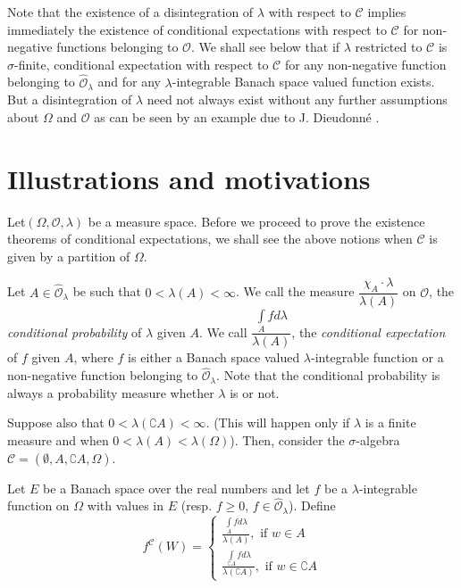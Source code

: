 Note that the existence of a disintegration of $\lambda$ with respect
to $\mathscr{C}$ implies immediately the existence of conditional
expectations with respect to $\mathscr{C}$ for non-negative functions
belonging to $\mathscr{O}$. We shall see below that if $\lambda$
restricted to $\mathscr{C}$ is $\sigma$-finite, conditional
expectation with respect to $\mathscr{C}$ for any non-negative
function belonging to $\hat{\mathscr{O}}_\lambda$ and for any
$\lambda$-integrable Banach space valued function exists. But a
disintegration of $\lambda$ need not always exist without any further
assumptions about $\Omega$ and $\mathscr{O}$ as can be seen by an
example due to J. Dieudonn\'e \cite{key1}. 

\section{Illustrations and motivations}\label{part1:chap1:sec4}

Let\pageoriginale $(\Omega, \mathscr{O}, \lambda)$ be a measure
space. Before we proceed to prove the existence theorems of
conditional expectations, we shall see the above notions when
$\mathscr{C}$ is given by a partition of $\Omega$. 

Let $A \in \hat{\mathscr{O}}_\lambda$ be such that $0 < \lambda (A) <
\infty$. We call the measure $\dfrac{\chi_A \cdot
  \lambda}{\lambda(A)}$ on $\mathscr{O}$, the \textit{conditional
  probability} of $\lambda$ given $A$. We call $\dfrac{\int\limits_A f
d \lambda}{\lambda(A)}$, the \textit{conditional expectation} of $f$
given $A$, where $f$ is either a Banach space valued
$\lambda$-integrable function or a non-negative function belonging to
$\hat{\mathscr{O}}_\lambda$. Note that the conditional probability is
always a probability measure whether $\lambda$ is or not. 

Suppose also that $0 < \lambda (\complement A) < \infty$. (This will
happen only if $\lambda$ is a finite measure and when $0 < \lambda (A)
< \lambda (\Omega)$). Then, consider the $\sigma$-algebra $\mathscr{C}
= (\emptyset, A, \complement A, \Omega)$. 

Let $E$ be a Banach space over the real numbers and let $f$ be a
$\lambda$-integrable function on $\Omega$ with values in $E$ (resp. $f
\geq 0$, $f \in\hat{\mathscr{O}}_\lambda$). Define
\begin{equation*}
f^\mathscr{C} (W) = 
\begin{cases}
\frac{\int\limits_A f d \lambda}{\lambda(A)}, \text{ if } w \in A\\[4pt]
\frac{\int\limits_{\complement A} f d \lambda}{\lambda(\complement
  A)}, \text{ if } w \in \complement A 
\end{cases}
\end{equation*}


